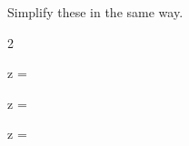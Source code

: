 \newpage
{}

Simplify these in the same way.
\begin{multicols}{2}
 \begin{ProblemSet}[pencil space=0in]


  \begin{Problem}
   \Large
   \begin{LeftEquation}
    z = 
   \end{LeftEquation}
  \end{Problem}

  \begin{Problem}
   \Large
   \begin{LeftEquation}
    z = 
   \end{LeftEquation}
  \end{Problem}

  \begin{Problem}
   \Large
   \begin{LeftEquation}
    z = 
   \end{LeftEquation}
  \end{Problem}

 \end{ProblemSet}
\end{multicols}

